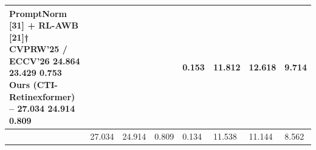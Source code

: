 \begin{tabular}{llllllll}
\toprule
PromptNorm [31] + RL-AWB [21]† CVPRW’25 / ECCV’26 24.864 23.429 0.753 Ours (CTI-Retinexformer) – 27.034 24.914 0.809 &  &  &  & 0.153 & 11.812 & 12.618 & 9.714 \\
\midrule
 & 27.034 & 24.914 & 0.809 & 0.134 & 11.538 & 11.144 & 8.562 \\
\bottomrule
\end{tabular}
